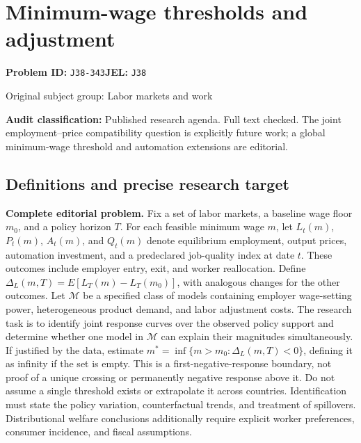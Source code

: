\documentclass[11pt,a4paper]{article}
\begin{document}
\section*{Minimum-wage thresholds and adjustment}
\textbf{Problem ID:} \texttt{J38-343}\quad \textbf{JEL:} \texttt{J38}\par
\label{problem:OP-0351}
{\sffamily\small\color{muted}Original subject group: Labor markets and work\par}
\label{definitions:problem:30007633}
\textbf{Audit classification:} Published research agenda. Full text checked. The joint employment--price compatibility question is explicitly future work; a global minimum-wage threshold and automation extensions are editorial.
\subsection*{Definitions and precise research target}
\textbf{Complete editorial problem.} Fix a set of labor markets, a baseline wage floor \(m_0\), and a policy horizon \(T\). For each feasible minimum wage \(m\), let \(L_t(m)\), \(P_t(m)\), \(A_t(m)\), and \(Q_t(m)\) denote equilibrium employment, output prices, automation investment, and a predeclared job-quality index at date \(t\). These outcomes include employer entry, exit, and worker reallocation. Define \(\Delta_L(m,T)=E[L_T(m)-L_T(m_0)]\), with analogous changes for the other outcomes. Let \(\mathcal M\) be a specified class of models containing employer wage-setting power, heterogeneous product demand, and labor adjustment costs. The research task is to identify joint response curves over the observed policy support and determine whether one model in \(\mathcal M\) can explain their magnitudes simultaneously. If justified by the data, estimate \(m^*=\inf\{m>m_0:\Delta_L(m,T)<0\}\), defining it as infinity if the set is empty. This is a first-negative-response boundary, not proof of a unique crossing or permanently negative response above it. Do not assume a single threshold exists or extrapolate it across countries. Identification must state the policy variation, counterfactual trends, and treatment of spillovers. Distributional welfare conclusions additionally require explicit worker preferences, consumer incidence, and fiscal assumptions.
\end{document}
